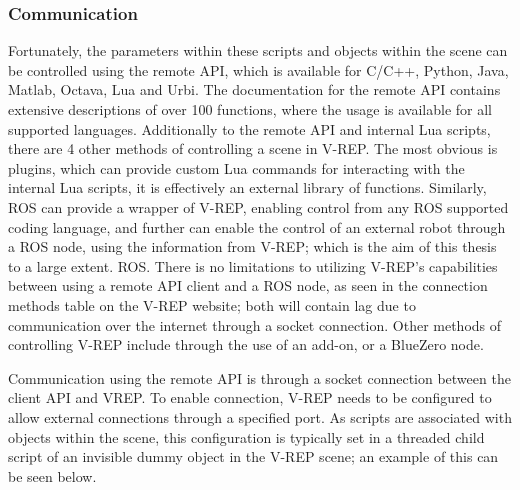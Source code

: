 \documentclass[12pt,openany,a4paper]{book}
\begin{document}
\subsubsection{Communication}
Fortunately, the parameters within these scripts and objects within the scene can be controlled using the remote API, which is available for C/C++, Python, Java, Matlab, Octava, Lua and Urbi. The documentation for the remote API contains extensive descriptions of over 100 functions, where the usage is available for all supported languages. Additionally to the remote API and internal Lua scripts, there are 4 other methods of controlling a scene in V-REP. The most obvious is plugins, which can provide custom Lua commands for interacting with the internal Lua scripts, it is effectively an external library of functions. Similarly, ROS can provide a wrapper of V-REP, enabling control from any ROS supported coding language, and further can enable the control of an external robot through a ROS node, using the information from V-REP; which is the aim of this thesis to a large extent. ROS. There is no limitations to utilizing V-REP's capabilities between using a remote API client and a ROS node, as seen in the connection methods table on the V-REP website; both will contain lag due to communication over the internet through a socket connection. Other methods of controlling V-REP include through the use of an add-on, or a BlueZero node.

Communication using the remote API is through a socket connection between the client API and VREP. To enable connection, V-REP needs to be configured to allow external connections through a specified port. As scripts are associated with objects within the scene, this configuration is typically set in a threaded child script of an invisible dummy object in the V-REP scene; an example of this can be seen below. 
\end{document}
